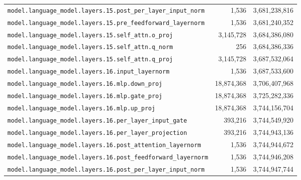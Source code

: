 \documentclass[10pt,a4paper]{article}
\theoremstyle{definition}
\begin{document}
\begin{appendices}
\begin{longtable}{p{9.5cm}rr}
\texttt{model.\allowbreak{}language\_model.\allowbreak{}layers.\allowbreak{}15.\allowbreak{}post\_per\_layer\_input\_norm} & 1,536 & 3,681,238,816 \\
\texttt{model.\allowbreak{}language\_model.\allowbreak{}layers.\allowbreak{}15.\allowbreak{}pre\_feedforward\_layernorm} & 1,536 & 3,681,240,352 \\
\texttt{model.\allowbreak{}language\_model.\allowbreak{}layers.\allowbreak{}15.\allowbreak{}self\_attn.\allowbreak{}o\_proj} & 3,145,728 & 3,684,386,080 \\
\texttt{model.\allowbreak{}language\_model.\allowbreak{}layers.\allowbreak{}15.\allowbreak{}self\_attn.\allowbreak{}q\_norm} & 256 & 3,684,386,336 \\
\texttt{model.\allowbreak{}language\_model.\allowbreak{}layers.\allowbreak{}15.\allowbreak{}self\_attn.\allowbreak{}q\_proj} & 3,145,728 & 3,687,532,064 \\
\texttt{model.\allowbreak{}language\_model.\allowbreak{}layers.\allowbreak{}16.\allowbreak{}input\_layernorm} & 1,536 & 3,687,533,600 \\
\texttt{model.\allowbreak{}language\_model.\allowbreak{}layers.\allowbreak{}16.\allowbreak{}mlp.\allowbreak{}down\_proj} & 18,874,368 & 3,706,407,968 \\
\texttt{model.\allowbreak{}language\_model.\allowbreak{}layers.\allowbreak{}16.\allowbreak{}mlp.\allowbreak{}gate\_proj} & 18,874,368 & 3,725,282,336 \\
\texttt{model.\allowbreak{}language\_model.\allowbreak{}layers.\allowbreak{}16.\allowbreak{}mlp.\allowbreak{}up\_proj} & 18,874,368 & 3,744,156,704 \\
\texttt{model.\allowbreak{}language\_model.\allowbreak{}layers.\allowbreak{}16.\allowbreak{}per\_layer\_input\_gate} & 393,216 & 3,744,549,920 \\
\texttt{model.\allowbreak{}language\_model.\allowbreak{}layers.\allowbreak{}16.\allowbreak{}per\_layer\_projection} & 393,216 & 3,744,943,136 \\
\texttt{model.\allowbreak{}language\_model.\allowbreak{}layers.\allowbreak{}16.\allowbreak{}post\_attention\_layernorm} & 1,536 & 3,744,944,672 \\
\texttt{model.\allowbreak{}language\_model.\allowbreak{}layers.\allowbreak{}16.\allowbreak{}post\_feedforward\_layernorm} & 1,536 & 3,744,946,208 \\
\texttt{model.\allowbreak{}language\_model.\allowbreak{}layers.\allowbreak{}16.\allowbreak{}post\_per\_layer\_input\_norm} & 1,536 & 3,744,947,744 \\

\end{longtable}
\end{appendices}
\end{document}
